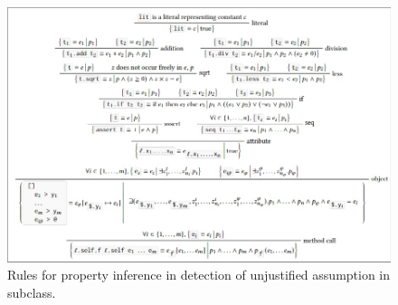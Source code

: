 \begin{figure}
  \includegraphics[width=\textwidth]{figs/properties}
  \caption{Rules for property inference in detection of unjustified assumption in subclass.}
  \label{fig:property_inference}
\end{figure}


